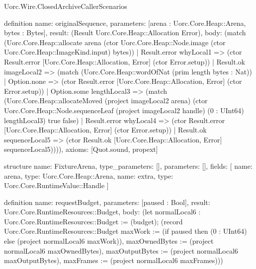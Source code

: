 \begin{lexlean}{Uorc.Wire.ClosedArchiveCallerScenarios}
\begin{semanticmodule}
definition{
  name: originalSequence,
  parameters: [arena : Uorc.Core.Heap::Arena, bytes : Bytes],
  result: (Result Uorc.Core.Heap::Allocation Error),
  body: (match (Uorc.Core.Heap::allocate arena (ctor Uorc.Core.Heap::Node.image (ctor Uorc.Core.Heap::ImageKind.input) bytes))
    | Result.error whyLocal1 => (ctor Result.error [Uorc.Core.Heap::Allocation, Error] (ctor Error.setup))
    | Result.ok imageLocal2 => (match (Uorc.Core.Heap::wordOfNat (prim length bytes : Nat))
      | Option.none => (ctor Result.error [Uorc.Core.Heap::Allocation, Error] (ctor Error.setup))
      | Option.some lengthLocal3 => (match (Uorc.Core.Heap::allocateMoved (project imageLocal2 arena) (ctor Uorc.Core.Heap::Node.sequenceLeaf (project imageLocal2 handle) (0 : UInt64) lengthLocal3) true false)
        | Result.error whyLocal4 => (ctor Result.error [Uorc.Core.Heap::Allocation, Error] (ctor Error.setup))
        | Result.ok sequenceLocal5 => (ctor Result.ok [Uorc.Core.Heap::Allocation, Error] sequenceLocal5)))),
  axioms: [Quot.sound, propext]
}

structure{
  name: FixtureArena,
  type_parameters: [],
  parameters: [],
  fields: [
    {name: arena, type: Uorc.Core.Heap::Arena},
    {name: extra, type: Uorc.Core.RuntimeValue::Handle}
  ]
}

definition{
  name: requestBudget,
  parameters: [paused : Bool],
  result: Uorc.Core.RuntimeResources::Budget,
  body: (let normalLocal6 : Uorc.Core.RuntimeResources::Budget := (budget); (record Uorc.Core.RuntimeResources::Budget {maxWork := (if paused then (0 : UInt64) else (project normalLocal6 maxWork)), maxOwnedBytes := (project normalLocal6 maxOwnedBytes), maxOutputBytes := (project normalLocal6 maxOutputBytes), maxFrames := (project normalLocal6 maxFrames)}))
}


\end{semanticmodule}
\end{lexlean}
